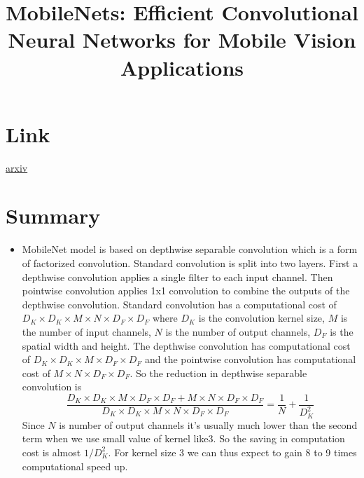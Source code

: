 \documentclass{article}
\title{MobileNets: Efficient Convolutional Neural Networks for Mobile Vision Applications}
\author{}
\date{}
\begin{document}
\maketitle

\section*{Link}
\href{https://arxiv.org/abs/1704.04861}{arxiv} 

\section*{Summary}
\begin{itemize}
    \item MobileNet model is based on depthwise separable convolution which is a form of factorized convolution. Standard convolution is split into two layers. First a depthwise convolution applies a single filter to each input channel. Then pointwise convolution applies 1x1 convolution to combine the outputs of the depthwise convolution. Standard convolution has a computational cost of $D_K \times D_K \times M \times N \times D_F \times D_F$ where $D_K$ is the convolution kernel size, $M$ is the number of input channels, $N$ is the number of output channels, $D_F$ is the spatial width and height. The depthwise convolution has computational cost of $D_K \times D_K \times M \times D_F \times D_F$ and the pointwise convolution has computational cost of $M \times N \times D_F \times D_F$. So the reduction in depthwise separable convolution is 
    \begin{equation*}
        \dfrac{D_K \times D_K \times M \times D_F \times D_F + M \times N \times D_F \times D_F}{D_K \times D_K \times M \times N \times D_F \times D_F} = \dfrac{1}{N} + \dfrac{1}{D_K^2}
    \end{equation*}
    Since $N$ is number of output channels it's usually much lower than the second term when we use small value of kernel like$3$. So the saving in computation cost is almost $1/D_K^2$. For kernel size $3$ we can thus expect to gain 8 to 9 times computational speed up.
    

\end{itemize}
\end{document}
